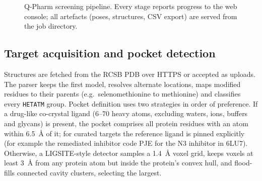 \documentclass[10pt,a4paper,twocolumn]{article}
\begin{document}
\begin{figure}[t]
\centering
{}
\caption{Q-Pharm screening pipeline. Every stage reports progress to the
web console; all artefacts (poses, structures, CSV export) are served from the job
directory.}
\label{fig:pipeline}
\end{figure}

\subsection{Target acquisition and pocket detection}

Structures are fetched from the RCSB PDB over HTTPS or accepted as uploads. The parser
keeps the first model, resolves alternate locations, maps modified residues to their
parents (e.g.\ selenomethionine to methionine) and classifies every \texttt{HETATM}
group. Pocket definition uses two strategies in order of preference. If a drug-like
co-crystal ligand (6--70 heavy atoms, excluding waters, ions, buffers and glycans) is
present, the pocket comprises all protein residues with an atom within 6.5~\AA{} of it;
for curated targets the reference ligand is pinned explicitly (for example the
remediated inhibitor code PJE for the N3 inhibitor in 6LU7). Otherwise, a
LIGSITE-style detector samples a 1.4~\AA{} voxel grid, keeps voxels at least 3~\AA{}
from any protein atom but inside the protein's convex hull, and flood-fills connected
cavity clusters, selecting the largest.
\end{document}
